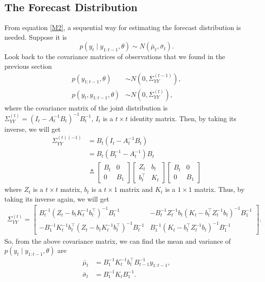 \subsection{The Forecast Distribution}\label{sectionforecast}

From equation \eqref{M2}, a sequential way for estimating the forecast distribution is needed. Suppose it is 
\begin{equation}
p(y_{t}\mid y_{1:t-1},\theta) \sim N\left( \bar{\mu}_{t},\bar{\sigma}_{t} \right). 
\end{equation}
Look back to the covariance matrices of observations that we found in the previous section 
\begin{align*}
p(y_{1:t-1},\theta) &\sim N\left( 0,\Sigma_{YY}^{(t-1)} \right),\\
p(y_{t},y_{1:t-1},\theta) &\sim N\left( 0,\Sigma_{YY}^{(t)} \right),
\end{align*}
where the covariance matrix of the joint distribution is $\Sigma_{YY}^{(t)} = (I_{t}-A_{t}^{-1}B_{t})^{-1}B_{t}^{-1}$, $I_t$ is a $t\times t$ identity matrix. Then, by taking its inverse, we will get 
\begin{align*}
\Sigma_{YY}^{(t) (-1)} &= B_{t}(I_{t}-A_{t}^{-1}B_{t}) \\
&= B_{t}(B_{t}^{-1}-A_{t}^{-1})B_{t} \\
&\triangleq \begin{bmatrix} 
B_t & 0 \\ 0 & B_1 \end{bmatrix}
\begin{bmatrix} 
Z_{t} & b_{t} \\
b_{t}^\top & K_{t}
\end{bmatrix} \begin{bmatrix} 
B_t & 0 \\ 0 & B_1\end{bmatrix}
\end{align*}
where $Z_{t}$ is a $t \times t$ matrix, $ b_{t} $ is a $t \times 1$ matrix and $K_{t}$ is a $1 \times 1$ matrix. Thus, by taking its inverse again, we will get 
\begin{align*} \Sigma_{YY}^{(t)}= \left[ \begin{matrix}
B_t^{-1} \left(Z_{t}-b_{t}K_{t}^{-1}b_{t}^\top\right)^{-1}B_t^{-1}  & - B_t^{-1}  Z_{t}^{-1}b_{t}\left(K_{t}-b_{t}^\top Z_{t}^{-1}b_{t}\right)^{-1}B_1^{-1} \\
-B_1^{-1}  K_{t}^{-1}b_{t}^\top \left(Z_{t}-b_{t}K_{t}^{-1}b_{t}^\top\right)^{-1}B_t^{-1}  & B_1^{-1}  \left(K_{t}-b_{t}^\top Z_{t}^{-1}b_{t}\right)^{-1}B_1^{-1} 
\end{matrix}\right].
\end{align*}
So, from the above covariance matrix, we can find the mean and variance of $p\left(y_{t}\mid y_{1:t-1},\theta\right)$ are 
\begin{align}
\bar{\mu}_{t} & =  B_1^{-1}K_{t}^{-1}b_{t}^\top B_{t-1}^{-1}y_{1:t-1} ,\\
\bar{\sigma}_{t} & =  B_1^{-1}K_{t}B_1^{-1}  .
\end{align}




